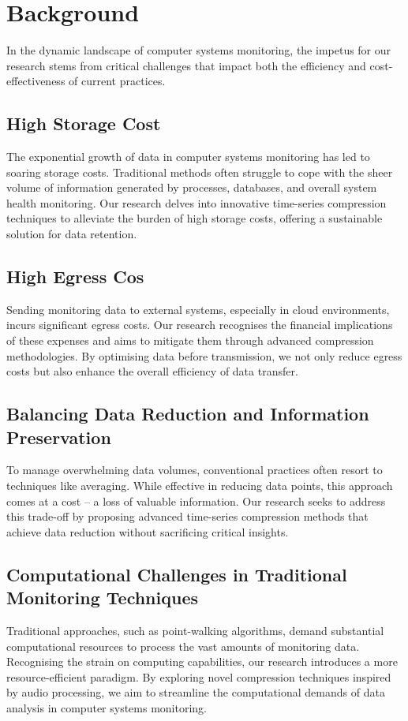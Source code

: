 \documentclass[conference]{IEEEtran}
\begin{document}
\section{Background}

In the dynamic landscape of computer systems monitoring, the impetus for our research stems from critical challenges that impact both the efficiency and cost-effectiveness of current practices. 

\subsection{High Storage Cost}

The exponential growth of data in computer systems monitoring has led to soaring storage costs. Traditional methods often struggle to cope with the sheer volume of information generated by processes, databases, and overall system health monitoring. Our research delves into innovative time-series compression techniques to alleviate the burden of high storage costs, offering a sustainable solution for data retention. 

\subsection{High Egress Cos}
Sending monitoring data to external systems, especially in cloud environments, incurs significant egress costs. Our research recognises the financial implications of these expenses and aims to mitigate them through advanced compression methodologies. By optimising data before transmission, we not only reduce egress costs but also enhance the overall efficiency of data transfer. 

\subsection{Balancing Data Reduction and Information Preservation}
To manage overwhelming data volumes, conventional practices often resort to techniques like averaging. While effective in reducing data points, this approach comes at a cost – a loss of valuable information. Our research seeks to address this trade-off by proposing advanced time-series compression methods that achieve data reduction without sacrificing critical insights. 

\subsection{Computational Challenges in Traditional Monitoring Techniques}
Traditional approaches, such as point-walking algorithms, demand substantial computational resources to process the vast amounts of monitoring data. Recognising the strain on computing capabilities, our research introduces a more resource-efficient paradigm. By exploring novel compression techniques inspired by audio processing, we aim to streamline the computational demands of data analysis in computer systems monitoring. 
\end{document}
